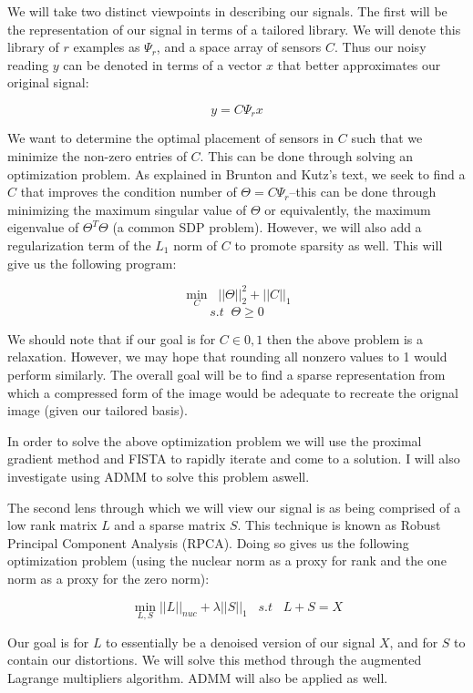 \documentclass[12pt, letterpaper]{article}
\begin{document}
	We will take two distinct viewpoints in describing our signals. The first will be the representation of our signal in terms of a tailored library. We will denote this library of $r$ examples as $\Psi_{r}$, and a space array of sensors $C$. Thus our noisy reading $y$ can be denoted in terms of a vector $x$ that better approximates our original signal:
	
	$$ y = C \Psi_{r} x $$
	
	We want to determine the optimal placement of sensors in $C$ such that we minimize the non-zero entries of $C$. This can be done through solving an optimization problem. As explained in Brunton and Kutz's text, we seek to find a $C$ that improves the condition number of $\Theta = C\Psi_{r}$--this can be done through minimizing the maximum singular value of $\Theta$ or equivalently, the maximum eigenvalue of $\Theta^{T}\Theta$ (a common SDP problem). However, we will also add a regularization term of the $L_{1}$ norm of $C$ to promote sparsity as well. This will give us the following program:
	

	$$ \min_{C} \;\; ||\Theta||_{2}^2 + ||C||_{1}$$
	$$ s.t \;\; \Theta \geq 0$$
	
	We should note that if our goal is for $C \in {0,1}$ then the above problem is a relaxation. However, we may hope that rounding all nonzero values to 1 would perform similarly. The overall goal will be to find a sparse representation from which a compressed form of the image would be adequate to recreate the orignal image (given our tailored basis).
	
	In order to solve the above optimization problem we will use the proximal gradient method and FISTA to rapidly iterate and come to a solution. I will also investigate using ADMM to solve this problem aswell.
	
	
	The second lens through which we will view our signal is as being comprised of a low rank matrix $L$ and a sparse matrix $S$. This technique is known as Robust Principal Component Analysis (RPCA). Doing so gives us the following optimization problem (using the nuclear norm as a proxy for rank and the one norm as a proxy for the zero norm):
	
	$$ \min_{L,S} ||L||_{nuc}+\lambda ||S||_{1}\;\;\; s.t \;\;\; L+S  =X$$
	
		
	Our goal is for $L$ to essentially be a denoised version of our signal $X$, and for $S$ to contain our distortions. We will solve this method through the augmented Lagrange multipliers algorithm. ADMM will also be applied as well.
	

	
	
\end{document}
